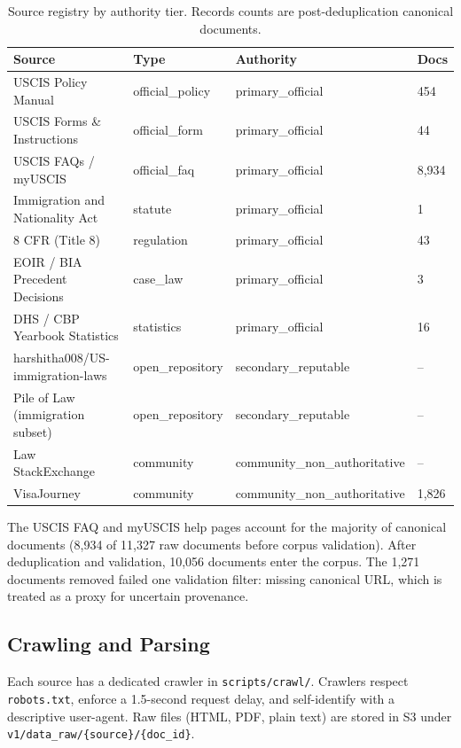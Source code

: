\documentclass[11pt]{article}
\begin{document}
\begin{table}[ht]
  \centering
  \caption{Source registry by authority tier. Records counts are post-deduplication canonical documents.}
  \label{tab:sources}
  \begin{tabular}{llll}
    \toprule
    Source & Type & Authority & Docs \\
    \midrule
    USCIS Policy Manual & official\_policy & primary\_official & 454 \\
    USCIS Forms \& Instructions & official\_form & primary\_official & 44 \\
    USCIS FAQs / myUSCIS & official\_faq & primary\_official & 8,934 \\
    Immigration and Nationality Act & statute & primary\_official & 1 \\
    8 CFR (Title 8) & regulation & primary\_official & 43 \\
    EOIR / BIA Precedent Decisions & case\_law & primary\_official & 3 \\
    DHS / CBP Yearbook Statistics & statistics & primary\_official & 16 \\
    harshitha008/US-immigration-laws & open\_repository & secondary\_reputable & -- \\
    Pile of Law (immigration subset) & open\_repository & secondary\_reputable & -- \\
    Law StackExchange & community & community\_non\_authoritative & -- \\
    VisaJourney & community & community\_non\_authoritative & 1,826 \\
    \bottomrule
  \end{tabular}
\end{table}

The USCIS FAQ and myUSCIS help pages account for the majority of canonical documents (8,934 of 11,327 raw documents before corpus validation). After deduplication and validation, 10,056 documents enter the corpus. The 1,271 documents removed failed one validation filter: missing canonical URL, which is treated as a proxy for uncertain provenance.

\subsection{Crawling and Parsing}
Each source has a dedicated crawler in \texttt{scripts/crawl/}. Crawlers respect \texttt{robots.txt}, enforce a 1.5-second request delay, and self-identify with a descriptive user-agent. Raw files (HTML, PDF, plain text) are stored in S3 under \texttt{v1/data\_raw/\{source\}/\{doc\_id\}}.
\end{document}
